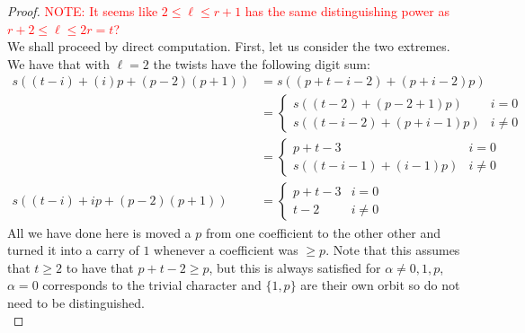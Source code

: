 \documentclass[12pt]{article}
\theoremstyle{customtheorem}%
\theoremstyle{remark}
\theoremstyle{definition}
\numberwithin{equation}{section}
\numberwithin{theorem}{section}
\begin{document}
\begin{proof}
\textcolor{red}{NOTE: It seems like $2 \leq \ell \leq r+1$ has the same distinguishing power as $r+2 \leq \ell \leq 2r=t$?}
\\

We shall proceed by direct computation. 
First, let us consider the two extremes. 
We have that with $\ell = 2$ the twists have the  following digit sum: \begin{align*}
 s((t-i) + (i)p + (p - 2)(p+1)) &= s((p + t - i - 2) + (p + i -2)p) \\ 
 &= \begin{cases}
s((t-2) + (p-2+1)p) & i = 0 \\
s((t-i-2) + (p+i-1)p)& i \neq 0
 \end{cases} \\
 &= \begin{cases}
 p+t - 3 & i = 0 \\
 s((t-i-1)+(i-1)p) & i \neq 0
 \end{cases} \\
  s((t-i) + ip + (p - 2)(p+1)) &= \begin{cases}
 p+t - 3 & i = 0 \\
 t-2 & i \neq 0
 \end{cases}
\end{align*}
All we have done here is moved a $p$ from one coefficient to the other other and turned it into a carry of $1$ whenever a coefficient was $\geq p$. 
Note that this assumes that $t \geq 2$ to have that $p+t-2 \geq p$, but this is always satisfied for $\alpha \neq 0,1,p$, $\alpha = 0$ corresponds to the trivial character and $\{1,p\}$ are their own orbit so do not need to be distinguished.
\\


\end{proof}
\end{document}
